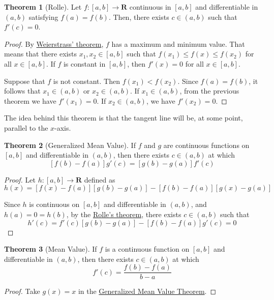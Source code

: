 \documentclass[tikz,12pt,a4paper]{article}
\theoremstyle{definition}
\newtheorem{theorem}{Theorem}[section]
\begin{document}
\begin{theorem}[Rolle]\label{thm:rolle}
	Let $f : [a,b] \longrightarrow \textbf{R}$ continuous in $[a,b]$ and differentiable in $(a,b)$ satisfying $f(a) = f(b)$. Then, there exists $c \in (a,b)$ such that $f'(c) = 0$.
\end{theorem}

\begin{proof}
	By \hyperref[thm:weierstrass]{Weierstrass' theorem}, $f$ has a maximum and minimum value. That means that there exists $x_1, x_2 \in [a,b]$ such that $f(x_1) \leq f(x) \leq f(x_2)$ for all $x \in [a,b]$. If $f$ is constant in $[a,b]$, then $f'(x) = 0$ for all $x \in [a,b]$.
	
	Suppose that $f$ is not constant. Then $f(x_1) < f(x_2)$. Since $f(a) = f(b)$, it follows that $x_1 \in (a,b)$ or $x_2 \in (a,b)$. If $x_1 \in (a,b)$, from the previous theorem we have $f'(x_1) = 0$. If $x_2 \in (a,b)$, we have $f'(x_2) = 0$.
\end{proof}

The idea behind this theorem is that the tangent line will be, at some point, parallel to the $x$-axis.

\begin{theorem}[Generalized Mean Value]\label{thm:generalized-mean-value}
	If $f$ and $g$ are continuous functions on $[a,b]$ and differentiable in $(a,b)$, then there exists $c \in (a,b)$ at which
	\[
		[f(b) - f(a)]g'(c) = [g(b) - g(a)]f'(c)
	\]
\end{theorem}

\begin{proof}
	Let $h : [a,b] \longrightarrow \textbf{R}$ defined as
	\[
		h(x) = [f(x) - f(a)][g(b) - g(a)] - [f(b) - f(a)][g(x) - g(a)]
	\]
	
	Since $h$ is continuous on $[a,b]$ and differentiable in $(a,b)$, and $h(a) = 0 = h(b)$, by the \hyperref[thm:rolle]{Rolle's theorem}, there exists $c \in (a,b)$ such that 
	\[
		h'(c) = f'(c)[g(b)-g(a)] - [f(b) - f(a)]g'(c) = 0
	\]
\end{proof}

\begin{theorem}[Mean Value]\label{thm:mean-value}
	If $f$ is a continuous function on $[a,b]$ and differentiable in $(a,b)$, then there exists $c \in (a,b)$ at which
	\[
		f'(c) = \frac{f(b) - f(a)}{b-a}
	\]
\end{theorem}

\begin{proof}
	Take $g(x) = x$ in the \hyperref[thm:generalized-mean-value]{Generalized Mean Value Theorem}.
\end{proof}
\end{document}
